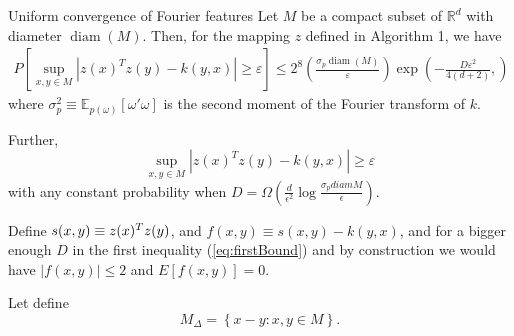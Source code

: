 \begin{frame}

  \begin{theorem}{Uniform convergence of Fourier features}
    Let $M$ be a compact subset of $\mathbb{R}^d$ with diameter $\operatorname{diam}(M)$. Then, for the mapping $z$ defined in Algorithm 1, we have
    \begin{align}
        P \left[
            \sup_{x,y \in M} |z(x)^T z(y) - k(y,x)|
            \geq \varepsilon
        \right]
        \leq 
        2^8
        \left(
            \frac{\sigma_p \operatorname{diam}(M)}{\varepsilon}
        \right)
        \exp \left(
            - \frac{D \varepsilon^2}{4(d+2)},
        \right)
    \end{align}
    where $\sigma_p^2 \equiv \mathbb{E}_{p(\omega)}[\omega' \omega]$ is the second moment of the Fourier transform of $k$.

    Further, 
    $$
    \sup_{x,y \in M} |z(x)^T z(y) - k(y,x)|
    \geq \varepsilon
    $$
    with any constant probability when 
    $D = \Omega \left( 
        \frac{d}{\epsilon^2}
        \log{\frac{\sigma_p diam{M}}{\epsilon}}
    \right).$
  \end{theorem}

\end{frame}

\begin{frame}
  
  
Define $s(x,y) \equiv z(x)^T z(y)$, and $f(x,y) \equiv s(x,y) - k(y,x)$, 
and for a bigger enough $D$ in the first inequality (\ref{eq:firstBound}) and by construction  we would have 
$|f(x,y) | \leq 2$ and $E[f(x,y)] = 0$. 


Let define
\begin{equation}
    M_\Delta
    =
    \left\{
    x - y : x,y \in M
    \right\}.
\end{equation}

\end{frame}

